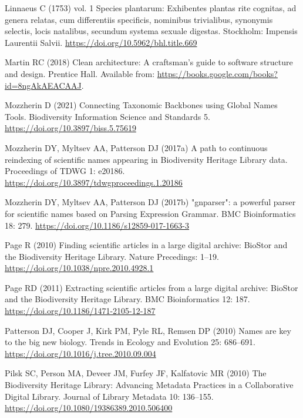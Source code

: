 \documentclass[
]{article}
\newlength{\cslhangindent}
\newlength{\cslentryspacingunit} %
\newenvironment{CSLReferences}[2] %
 {%
  \setlength{\parindent}{0pt}
  \ifodd #1
  \let\oldpar\par
  \def\par{\hangindent=\cslhangindent\oldpar}
  \fi
  \setlength{\parskip}{#2\cslentryspacingunit}
 }%
 {}
\begin{document}
\begin{CSLReferences}{1}{0}
\leavevmode{}%
Linnaeus C (1753) vol. 1 Species plantarum: Exhibentes plantas rite
cognitas, ad genera relatas, cum differentiis specificis, nominibus
trivialibus, synonymis selectis, locis natalibus, secundum systema
sexuale digestas. Stockholm: Impensis Laurentii Salvii.
\url{https://doi.org/10.5962/bhl.title.669}

\leavevmode{}%
Martin RC (2018) Clean architecture: A craftsman's guide to software
structure and design. Prentice Hall. Available from:
\url{https://books.google.com/books?id=8ngAkAEACAAJ}.

\leavevmode{}%
Mozzherin D (2021) {Connecting Taxonomic Backbones using Global Names
Tools}. Biodiversity Information Science and Standards 5.
\url{https://doi.org/10.3897/biss.5.75619}

\leavevmode{}%
Mozzherin DY, Myltsev AA, Patterson DJ (2017a) {A path to continuous
reindexing of scientific names appearing in Biodiversity Heritage
Library data}. Proceedings of TDWG 1: e20186.
\url{https://doi.org/10.3897/tdwgproceedings.1.20186}

\leavevmode{}%
Mozzherin DY, Myltsev AA, Patterson DJ (2017b) {"gnparser": a powerful
parser for scientific names based on Parsing Expression Grammar}. BMC
Bioinformatics 18: 279. \url{https://doi.org/10.1186/s12859-017-1663-3}

\leavevmode{}%
Page R (2010) {Finding scientific articles in a large digital archive:
BioStor and the Biodiversity Heritage Library}. Nature Precedings:
1--19. \url{https://doi.org/10.1038/npre.2010.4928.1}

\leavevmode{}%
Page RD (2011) {Extracting scientific articles from a large digital
archive: BioStor and the Biodiversity Heritage Library}. BMC
Bioinformatics 12: 187. \url{https://doi.org/10.1186/1471-2105-12-187}

\leavevmode{}%
Patterson DJ, Cooper J, Kirk PM, Pyle RL, Remsen DP (2010) {Names are
key to the big new biology}. Trends in Ecology and Evolution 25:
686--691. \url{https://doi.org/10.1016/j.tree.2010.09.004}

\leavevmode{}%
Pilsk SC, Person MA, Deveer JM, Furfey JF, Kalfatovic MR (2010) {The
Biodiversity Heritage Library: Advancing Metadata Practices in a
Collaborative Digital Library}. Journal of Library Metadata 10:
136--155. \url{https://doi.org/10.1080/19386389.2010.506400}


\end{CSLReferences}
\end{document}
